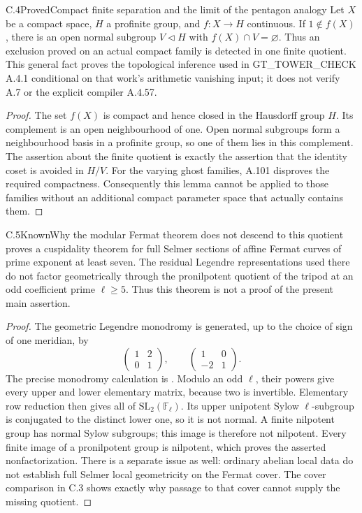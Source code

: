 \begin{result}{C.4}{Proved}{Compact finite separation and the limit of the pentagon analogy}
Let \(X\) be a compact space, \(H\) a profinite group, and
\(f:X\to H\) continuous. If \(1\notin f(X)\), there is an open
normal subgroup \(V\triangleleft H\) with \(f(X)\cap V=\varnothing\).
Thus an exclusion proved on an actual compact family is detected in
one finite quotient. This general fact proves the topological inference
used in GT\_TOWER\_CHECK A.4.1 conditional on that work's arithmetic
vanishing input; it does not verify A.7 or the explicit compiler A.4.57.
\end{result}
\begin{proof}
The set \(f(X)\) is compact and hence closed in the Hausdorff group
\(H\). Its complement is an open neighbourhood of one. Open normal
subgroups form a neighbourhood basis in a profinite group, so one of
them lies in this complement. The assertion about the finite quotient
is exactly the assertion that the identity coset is avoided in \(H/V\).
For the varying ghost families, A.101 disproves the required compactness.
Consequently this lemma cannot be applied to those families without
an additional compact parameter space that actually contains them.
\end{proof}

\begin{result}{C.5}{Known}{Why the modular Fermat theorem does not descend to this quotient}
\citet[Theorem A and Theorem 5.14]{Steklov2026} proves a cuspidality
theorem for full Selmer sections of affine Fermat curves of prime
exponent at least seven. The residual Legendre representations used
there do not factor geometrically through the pronilpotent quotient of
the tripod at an odd coefficient prime \(\ell\ge5\).
Thus this theorem is not a proof of the present main assertion.
\end{result}
\begin{proof}
The geometric Legendre monodromy is generated, up to the choice of
sign of one meridian, by
\[
 \begin{pmatrix}1&2\\0&1\end{pmatrix},\qquad
 \begin{pmatrix}1&0\\-2&1\end{pmatrix}.
\]
The precise monodromy calculation is \citet[\S5.1]{Stix2015}.
Modulo an odd \(\ell\), their powers give every upper and lower
elementary matrix, because two is invertible. Elementary row reduction
then gives all of \(\mathrm{SL}_2(\mathbb F_\ell)\).
Its upper unipotent Sylow \(\ell\)-subgroup is conjugated to the
distinct lower one, so it is not normal. A finite nilpotent group has
normal Sylow subgroups; this image is therefore not nilpotent.
Every finite image of a pronilpotent group is nilpotent, which proves
the asserted nonfactorization. There is a separate issue as well:
ordinary abelian local data do not establish full Selmer local
geometricity on the Fermat cover. The cover comparison in C.3 shows
exactly why passage to that cover cannot supply the missing quotient.
\end{proof}

